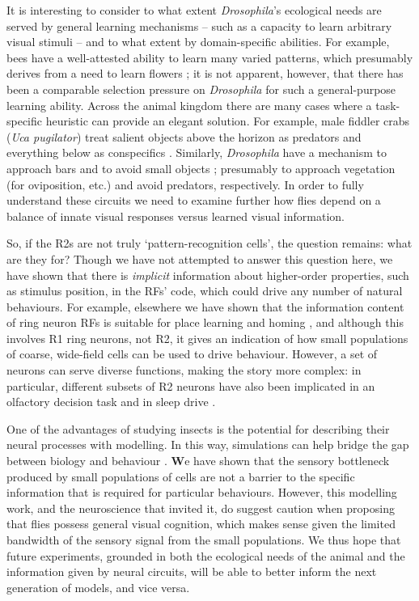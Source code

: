It is interesting to consider to what extent \emph{Drosophila}'s ecological needs are served by general learning mechanisms -- such as a capacity to learn arbitrary visual stimuli -- and to what extent by domain-specific abilities.
For example, bees have a well-attested ability to learn many varied patterns, which presumably derives from a need to learn flowers \cite{Gould1985}; it is not apparent, however, that there has been a comparable selection pressure on \emph{Drosophila} for such a general-purpose learning ability.
Across the animal kingdom there are many cases where a task-specific heuristic can provide an elegant solution.
For example, male fiddler crabs (\emph{Uca pugilator}) treat salient objects above the horizon as predators and everything below as conspecifics \cite{Layne1997}.
Similarly, \emph{Drosophila} have a mechanism to approach bars and to avoid small objects \cite{Maimon2008}; presumably to approach vegetation (for oviposition, etc.) and avoid predators, respectively.
In order to fully understand these circuits we need to examine further how flies depend on a balance of innate visual responses versus learned visual information.

So, if the R2s are not truly `pattern-recognition cells', the question remains: what are they for?
Though we have not attempted to answer this question here, we have shown that there is \emph{implicit} information about higher-order properties, such as stimulus position, in the RFs' code, which could drive any number of natural behaviours.
For example, elsewhere we have shown that the information content of ring neuron RFs is suitable for place learning and homing \cite{Dewar2015,Ofstad2011}, and although this involves R1 ring neurons, not R2, it gives an indication of how small populations of coarse, wide-field cells can be used to drive behaviour.
However, a set of neurons can serve diverse functions, making the story more complex: in particular, different subsets of R2 neurons have also been implicated in an olfactory decision task \cite{Azanchi2013} and in sleep drive \cite{Liu2016}.

One of the advantages of studying insects is the potential for describing their neural processes with modelling.
In this way, simulations can help bridge the gap between biology and behaviour \cite{Webb2009}.
{\textbf
We have shown that the sensory bottleneck produced by small populations of cells are not a barrier to the specific information that is required for particular behaviours.
However, this modelling work, and the neuroscience that invited it, do suggest caution when proposing that flies possess general visual cognition, which makes sense given the limited bandwidth of the sensory signal from the small populations.
}
We thus hope that future experiments, grounded in both the ecological needs of the animal and the information given by neural circuits, will be able to better inform the next generation of models, and vice versa.

